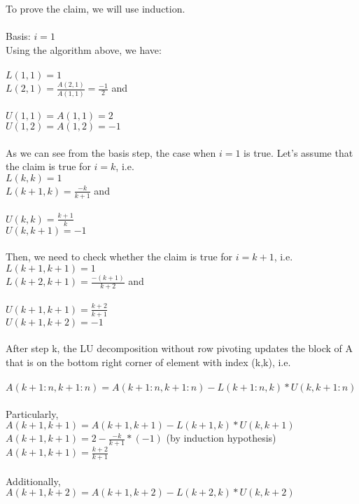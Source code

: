 \documentclass{article}
\DeclareMathOperator{\1}{\mathit{1}}
\numberwithin{figure}{section} %
\numberwithin{table}{section}
\begin{document}
\indent To prove the claim, we will use induction.\\\\
Basis: \(i=1\)\\
Using the algorithm above, we have:\\\\
\indent \(L(1,1)=1\)\\
\indent \(L(2,1)= \frac{A(2,1)}{A(1,1)}= \frac{-1}{2}\) and \\\\
\indent \(U(1,1)= A(1,1) = 2\)\\
\indent \(U(1,2)=A(1,2)=-1\)\\\\
As we can see from the basis step, the case when \(i=1\) is true. Let's assume that the claim is true for \(i=k\), i.e.\\
\indent \(L(k,k)=1\)\\
\indent \(L(k+1,k)= \frac{-k}{k+1}\) and \\\\
\indent \(U(k,k)= \frac{k+1}{k}\)\\
\indent \(U(k,k+1)=-1\)\\\\
Then, we need to check whether the claim is true for \(i=k+1\), i.e.\\ 
\indent \(L(k+1,k+1)=1\)\\
\indent \(L(k+2,k+1)= \frac{-(k+1)}{k+2}\) and \\\\
\indent \(U(k+1,k+1)= \frac{k+2}{k+1}\)\\
\indent \(U(k+1,k+2)=-1\)\\\\
After step k, the LU decomposition without row pivoting updates the block of A that is on the bottom right corner of element with index (k,k), i.e. \\\\
\indent \(A(k+1:n,k+1:n) = A(k+1:n,k+1:n) - L(k+1:n,k)*U(k,k+1:n) \)\\\\
Particularly,\\
\indent \(A(k+1,k+1)= A(k+1,k+1) - L(k+1,k)*U(k,k+1)\)\\
\indent \(A(k+1,k+1)= 2 - \frac{-k}{k+1} *(-1)\) \indent\indent (by induction hypothesis)\\
\indent \(A(k+1,k+1)= \frac{k+2}{k+1} \)\\\\
Additionally, \\
\indent \(A(k+1,k+2)= A(k+1,k+2) - L(k+2,k)*U(k,k+2)\)\\
\end{document}
